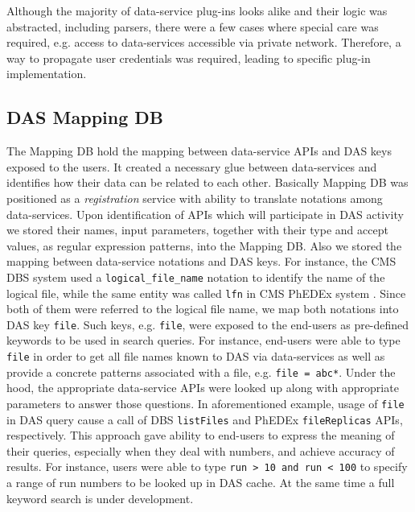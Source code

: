 \documentclass[1p,times]{elsarticle}
\begin{document}
Although the majority of data-service plug-ins looks alike
and their logic was abstracted, including parsers, there were a few
cases where special care was required, e.g. access to data-services 
accessible via private network. Therefore, a way to propagate 
user credentials was required, leading to specific plug-in implementation.


\subsection{DAS Mapping DB}
The Mapping DB hold the mapping between data-service APIs and DAS keys exposed to
the users. It created a necessary glue between data-services and identifies
how their data can be related to each other. Basically Mapping DB was positioned 
as a {\it registration} service with ability to translate notations among data-services.
Upon identification of APIs which will participate in DAS activity 
we stored their names, input parameters, together with their type and accept 
values, as regular expression patterns, into the Mapping DB. 
Also we stored the mapping between data-service notations and DAS keys. 
For instance, the CMS DBS system \cite{DBS}
used a \verb+logical_file_name+ notation to identify the name of the
logical file, while the same entity was called \verb+lfn+ 
in CMS PhEDEx system \cite{PhEDEx}.
Since both of them were referred to the logical file name, 
we map both notations into DAS key \verb+file+.
Such keys, e.g. \verb+file+, were exposed to the end-users as pre-defined keywords to
be used in search queries. For instance, end-users were able to type \verb+file+ in
order to get all file names known to DAS via data-services as well as
provide a concrete patterns associated with a file, e.g. \verb+file = abc*+.
Under the hood, the appropriate data-service APIs were looked up along with appropriate
parameters to answer those questions. In aforementioned example, 
usage of \verb+file+ in DAS query cause a call of DBS 
\verb+listFiles+ and PhEDEx \verb+fileReplicas+ APIs, respectively.
This approach gave ability to end-users to express the meaning of their queries, especially
when they deal with numbers, and achieve accuracy of results. 
For instance, users were able to type \verb+run > 10 and run < 100+
to specify a range of run numbers to be looked up in DAS cache. At the same time
a full keyword search is under development.
\end{document}
